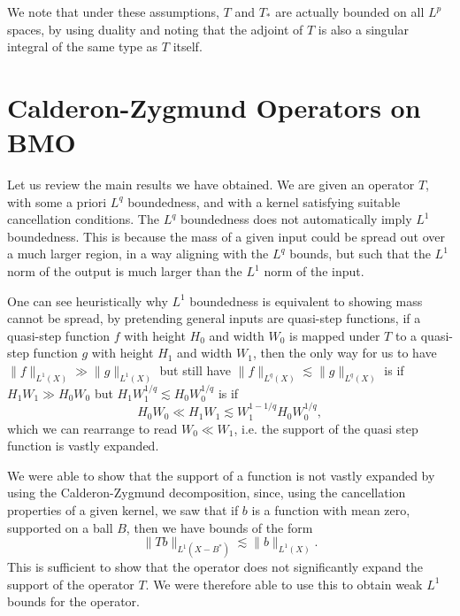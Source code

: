 We note that under these assumptions, $T$ and $T_*$ are actually bounded on all $L^p$ spaces, by using duality and noting that the adjoint of $T$ is also a 
singular integral of the same type as $T$ itself.


\section{Calderon-Zygmund Operators on BMO}

Let us review the main results we have obtained. We are given an operator $T$, with some a priori $L^q$ boundedness, and with a kernel satisfying suitable cancellation conditions. The $L^q$ boundedness does not automatically imply $L^1$ boundedness. This is because the mass of a given input could be spread out over a much larger region, in a way aligning with the $L^q$ bounds, but such that the $L^1$ norm of the output is much larger than the $L^1$ norm of the input.

\begin{remark}
    One can see heuristically why $L^1$ boundedness is equivalent to showing mass cannot be spread, by pretending general inputs are quasi-step functions, if a quasi-step function $f$ with height $H_0$ and width $W_0$ is mapped under $T$ to a quasi-step function $g$ with height $H_1$ and width $W_1$, then the only way for us to have $\| f \|_{L^1(X)} \gg \| g \|_{L^1(X)}$ but still have $\| f \|_{L^q(X)} \lesssim \| g \|_{L^q(X)}$ is if $H_1 W_1 \gg H_0W_0$ but $H_1W_1^{1/q} \lesssim H_0 W_0^{1/q}$ is if
    \[ H_0W_0 \ll H_1 W_1 \lesssim W_1^{1 - 1/q} H_0 W_0^{1/q}, \]
    which we can rearrange to read $W_0 \ll W_1$, i.e. the support of the quasi step function is vastly expanded.
\end{remark}

We were able to show that the support of a function is not vastly expanded by using the Calderon-Zygmund decomposition, since, using the cancellation properties of a given kernel, we saw that if $b$ is a function with mean zero, supported on a ball $B$, then we have bounds of the form
%
\[ \| Tb \|_{L^1(X - B^*)} \lesssim \| b \|_{L^1(X)}. \]
%
This is sufficient to show that the operator does not significantly expand the support of the operator $T$. We were therefore able to use this to obtain weak $L^1$ bounds for the operator.

